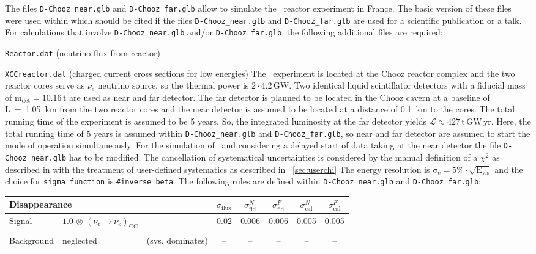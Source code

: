 \begin{appendix}
The files {\tt D-Chooz\_near.glb} and {\tt D-Chooz\_far.glb} allow to simulate the \DC\ reactor experiment in France. 
The basic version of these files were used within \cite{Huber:2006vr} which should be cited if the files 
{\tt D-Chooz\_near.glb} and {\tt D-Chooz\_far.glb} are
used for a scientific publication or a talk. For calculations that involve {\tt D-Chooz\_near.glb} and/or {\tt D-Chooz\_far.glb}, the following
additional files are required:
\bi
\item {\tt Reactor.dat} (neutrino flux from reactor)
\item {\tt XCCreactor.dat} (charged current cross sections for low energies)
\ei
The \DC\ experiment is located at the Chooz reactor complex and the two reactor cores serve as $\bar{\nu}_e$
neutrino source, so the thermal power is $\mathrm{2\cdot4.2\,GW}$. Two identical liquid scintillator detectors
with a fiducial mass of $\mathrm{m_{det} = 10.16 \,t}$ are used as near and far detector. The far detector
is planned to be located in the {\sc Chooz} cavern at a baseline of L~=~1.05~km from the two reactor cores and
the near detector is assumed to be located at a distance of 0.1~km to the cores. The total running time of the
experiment is assumed to be 5 years. So, the integrated luminosity at the far detector yields $\mathrm{\mathcal{L} \approx
427 \,t \, GW\, yr}$.
Here, the total running time of 5 years is assumed within {\tt D-Chooz\_near.glb} and {\tt D-Chooz\_far.glb}, so near
and far detector are assumed to start the mode of operation simultaneously. For the simulation of \DC\ and
considering a delayed start of data taking at the near detector the file {\tt D-Chooz\_near.glb} has to be
modified. The cancellation of systematical uncertainties is considered by the manual definition of a $\chi^2$
as described in \cite{Huber:2006vr} with the treatment of user-defined systematics as described in \Sec~\ref{sec:userchi}   
The energy resolution is
$\mathrm{\sigma_e=5\%\cdot\sqrt{E_{vis}}}$ and the choice for {\tt sigma\_function} is {\tt \#inverse\_beta}. The following rules are defined within {\tt D-Chooz\_near.glb} and {\tt D-Chooz\_far.glb}: 
\begin{center}
\begin{tabular}{|l|ll|c|c|c|c|c|}
\hline \hline
\multicolumn{3}{|l|}{Disappearance} & $\sigma_\mathrm{flux}$ & $\sigma^N_\mathrm{fid}$ & $\sigma^F_\mathrm{fid}$ &
$\sigma^N_\mathrm{cal}$ & $\sigma^F_\mathrm{cal}$ \\ \hline 
Signal & $1.0 \, \otimes \, (\bar{\nu}_e\rightarrow\bar{\nu}_e)_{\mathrm{CC}}$ & & 0.02 & 0.006 & 0.006 & 0.005 &
0.005 \\
 & & & & & & & \\
Background & neglected & (sys. dominates) & -- & -- & -- & -- & -- \\ \hline \hline 
\end{tabular}
\end{center}


\end{appendix}
